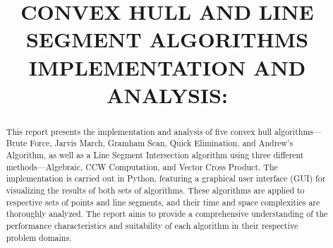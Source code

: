 \documentclass{fast-nuces-bs}
\title{CONVEX HULL AND LINE SEGMENT ALGORITHMS IMPLEMENTATION AND ANALYSIS:}
\begin{document}
\begin{abstract}
This report presents the implementation and analysis of five convex hull algorithms—Brute Force, Jarvis March, Gramham Scan, Quick Elimination, and Andrew’s Algorithm, as well as a Line Segment Intersection algorithm using three different methods—Algebraic, CCW Computation, and Vector Cross Product. The implementation is carried out in Python, featuring a graphical user interface (GUI) for visualizing the results of both sets of algorithms. These algorithms are applied to respective sets of points and line segments, and their time and space complexities are thoroughly analyzed. The report aims to provide a comprehensive understanding of the performance characteristics and suitability of each algorithm in their respective problem domains.
\end{abstract}










\end{document}
